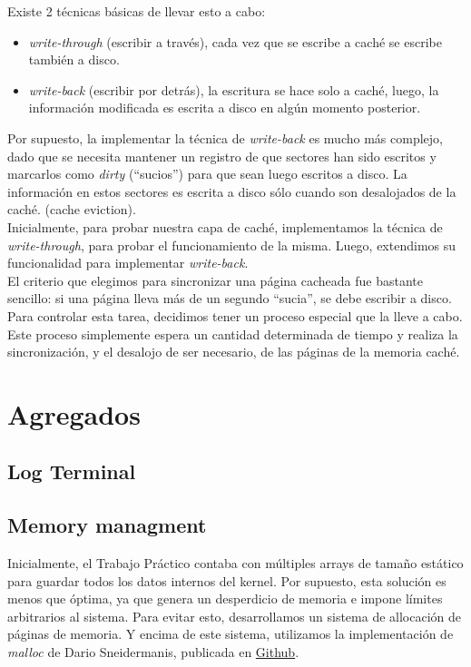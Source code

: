 \documentclass[a4paper,10pt]{article}
\begin{document}
Existe 2 técnicas básicas de llevar esto a cabo:

\begin{itemize}
  \item \textit{write-through} (escribir a través), cada vez que se escribe a caché se escribe también a disco.
  \item \textit{write-back} (escribir por detrás), la escritura se hace solo a caché, luego, la información modificada es escrita a disco en algún momento posterior.
\end{itemize}

Por supuesto, la implementar la técnica de \textit{write-back} es mucho más complejo, dado que se necesita mantener un registro de que sectores han sido escritos y 
marcarlos como \textit{dirty} (``sucios'') para que sean luego escritos a disco. La información en estos sectores es escrita a disco sólo cuando son desalojados
de la caché. (cache eviction). \\

Inicialmente, para probar nuestra capa de caché, implementamos la técnica de \textit{write-through}, para probar el funcionamiento de la misma. 
Luego, extendimos su funcionalidad para implementar \textit{write-back}. \\

El criterio que elegimos para sincronizar una página cacheada fue bastante sencillo: si una página lleva más de un segundo ``sucia'', se debe escribir a disco.
Para controlar esta tarea, decidimos tener un proceso especial que la lleve a cabo. Este proceso simplemente espera un cantidad determinada de tiempo y realiza 
la sincronización, y el desalojo de ser necesario, de las páginas de la memoria caché.


\newpage
\section{Agregados}

\subsection{Log Terminal}

\subsection{Memory managment}
Inicialmente, el Trabajo Práctico contaba con múltiples arrays de tamaño estático para guardar todos los datos internos del kernel.
Por supuesto, esta solución es menos que óptima, ya que genera un desperdicio de memoria e impone límites arbitrarios al sistema.
Para evitar esto, desarrollamos un sistema de allocación de páginas de memoria.
Y encima de este sistema, utilizamos la implementación de \textit{malloc} de Dario Sneidermanis, publicada en \href{https://github.com/esneider/malloc}{Github}.
\end{document}

